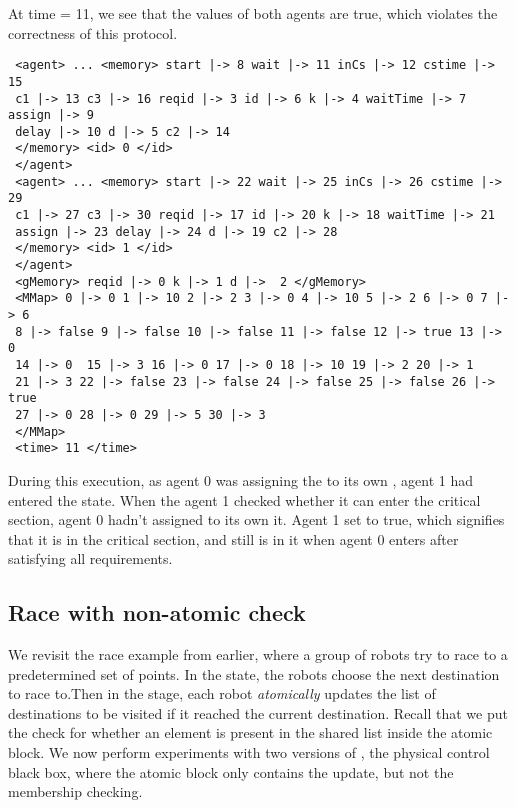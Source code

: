 At time = 11, we see that the  values of both agents are true, which violates the correctness of this protocol. 

 
\begin{verbatim}
 <agent> ... <memory> start |-> 8 wait |-> 11 inCs |-> 12 cstime |-> 15 
 c1 |-> 13 c3 |-> 16 reqid |-> 3 id |-> 6 k |-> 4 waitTime |-> 7 assign |-> 9
 delay |-> 10 d |-> 5 c2 |-> 14 
 </memory> <id> 0 </id> 
 </agent> 
 <agent> ... <memory> start |-> 22 wait |-> 25 inCs |-> 26 cstime |-> 29
 c1 |-> 27 c3 |-> 30 reqid |-> 17 id |-> 20 k |-> 18 waitTime |-> 21 
 assign |-> 23 delay |-> 24 d |-> 19 c2 |-> 28 
 </memory> <id> 1 </id> 
 </agent>
 <gMemory> reqid |-> 0 k |-> 1 d |->  2 </gMemory>
 <MMap> 0 |-> 0 1 |-> 10 2 |-> 2 3 |-> 0 4 |-> 10 5 |-> 2 6 |-> 0 7 |-> 6
 8 |-> false 9 |-> false 10 |-> false 11 |-> false 12 |-> true 13 |-> 0
 14 |-> 0  15 |-> 3 16 |-> 0 17 |-> 0 18 |-> 10 19 |-> 2 20 |-> 1 
 21 |-> 3 22 |-> false 23 |-> false 24 |-> false 25 |-> false 26 |-> true
 27 |-> 0 28 |-> 0 29 |-> 5 30 |-> 3 
 </MMap>
 <time> 11 </time>
\end{verbatim}

During this execution, as agent 0 was assigning the  to its own , agent 1 had entered the  state. 
When the agent 1 checked whether it can enter the critical section, agent 0 hadn't assigned  to its own it. Agent 1 set  to true, which signifies that it is in the critical section, and still is in it when agent 0 enters after satisfying all requirements. 


\subsection{Race with non-atomic check}
We revisit the race example from earlier, where a group of robots try to race to a predetermined set of points. In the  state, the robots choose the next destination to race to.Then in the  stage, each robot \emph{atomically} updates the list of destinations to be visited if it reached the current destination. Recall that we put the check for whether an element is present in the shared list  inside the atomic block. We now perform experiments with two versions of , the physical control black box, where the atomic block only contains the update, but not the membership checking.  

